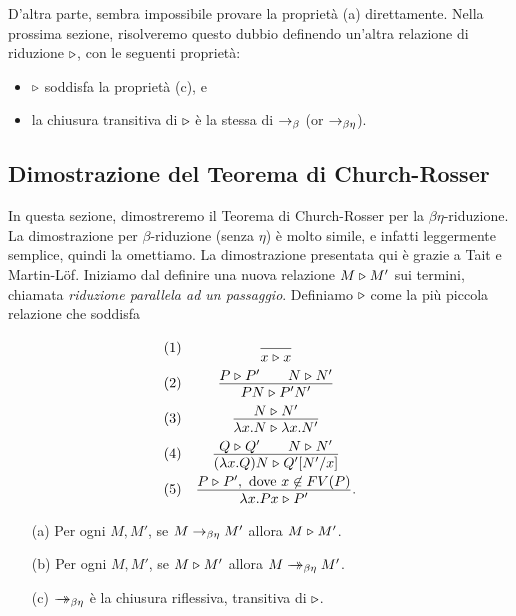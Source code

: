 \documentclass{article}
\begin{document}
D'altra parte, sembra impossibile provare la propriet\`a (a) direttamente.
Nella prossima sezione, risolveremo questo dubbio definendo
un'altra relazione di riduzione $\mathrel{\triangleright}$, con le seguenti propriet\`a:
\begin{itemize}
\item $\mathrel{\triangleright}$ soddisfa la propriet\`a (c), e
\item la chiusura transitiva di $\mathrel{\triangleright}$ \`e la stessa di $\rightarrow_{\beta}$
  (or $\rightarrow_{\beta\eta}$).
\end{itemize}

\subsection{Dimostrazione del Teorema di Church-Rosser}
\label{subsec-proof-cr}

In questa sezione, dimostreremo il Teorema di Church-Rosser per la
$\beta\eta$-riduzione. La dimostrazione per $\beta$-riduzione (senza
$\eta$) \`e molto simile, e infatti leggermente semplice, quindi
la omettiamo. La dimostrazione presentata qui \`e grazie a Tait e Martin-L\"of. Iniziamo
dal definire una nuova relazione $M\mathrel{\triangleright} M'$ sui termini, chiamata {\em
 riduzione parallela ad un passaggio}. Definiamo $\mathrel{\triangleright}$ come la pi\`u
piccola relazione che soddisfa
\[ \begin{array}{lc}
  (1) & \deriv{}{x\tri x} \nl
  (2) & \deriv{P \tri P' \sep N \tri N'}{PN \tri P'N'} \nl
  (3) & \deriv{N \tri N'}{\lam x.N \tri \lam x.N'} \nl
  (4) & \deriv{Q \tri Q' \sep N \tri N'}{(\lam x.Q)N \tri \subst{Q'}{N'}{x}}
  \nl
  (5) & \deriv{P \tri P',\mbox{ dove $x\not\in\FV{P}$}}{\lam x.Px
    \tri P'}.
\end{array}
\]

\begin{lemma}\label{lem-tri-redbes}
  \begin{enumerate}
  \item[(a)] Per ogni $M,M'$, se $M\rightarrow_{\beta\eta} M'$ allora $M\mathrel{\triangleright} M'$.
  \item[(b)] Per ogni $M,M'$, se $M\mathrel{\triangleright} M'$ allora $M\mathrel{\rightarrow\!\!\!\!\!\rightarrow}_{\beta\eta} M'$.
  \item[(c)] $\mathrel{\rightarrow\!\!\!\!\!\rightarrow}_{\beta\eta}$ \`e la chiusura riflessiva, transitiva di $\mathrel{\triangleright}$.
  \end{enumerate}
\end{lemma}
\end{document}
